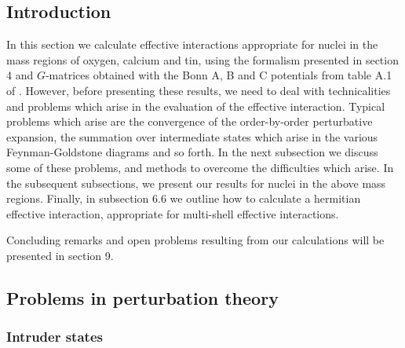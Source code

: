 
\subsection{Introduction}

In this section  we calculate effective interactions
appropriate for nuclei in the mass regions of oxygen, calcium and
tin, using the formalism presented in section 4   and
$G$-matrices obtained with the Bonn A, B and C potentials
from table A.1 of \cite{mac89}. However, before
presenting these results, we need to deal with technicalities and problems
which arise in the evaluation of the effective interaction.
Typical problems which arise are the convergence of the
order-by-order perturbative expansion, the summation over
intermediate states which arise in the various Feynman-Goldstone
diagrams and so forth. In the next subsection we discuss
some of these problems, and methods to overcome the difficulties
which arise. In the subsequent
subsections, we present our results
for nuclei in the above mass regions. Finally, in subsection 6.6 we outline
how to calculate a hermitian effective interaction, appropriate
for multi-shell effective interactions.

Concluding remarks and open
problems resulting from our calculations
will be presented in section 9. 


\subsection{Problems in perturbation theory}

\subsubsection{Intruder states}


